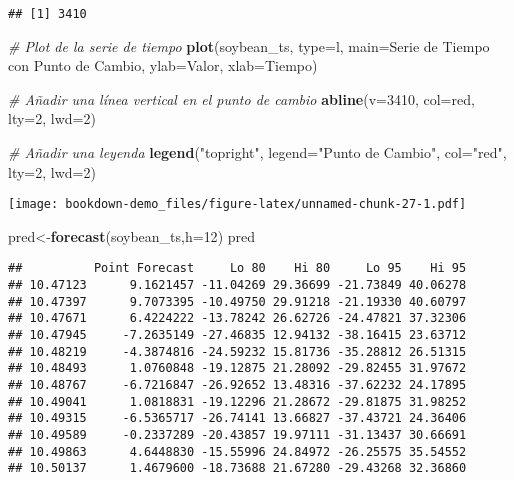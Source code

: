 \documentclass[
]{book}
\newenvironment{Shaded}{\begin{snugshade}}{\end{snugshade}}
\newcommand{\AttributeTok}[1]{\textcolor[rgb]{0.13,0.29,0.53}{#1}}
\newcommand{\CommentTok}[1]{\textcolor[rgb]{0.56,0.35,0.01}{\textit{#1}}}
\newcommand{\DecValTok}[1]{\textcolor[rgb]{0.00,0.00,0.81}{#1}}
\newcommand{\FunctionTok}[1]{\textcolor[rgb]{0.13,0.29,0.53}{\textbf{#1}}}
\newcommand{\NormalTok}[1]{#1}
\newcommand{\OtherTok}[1]{\textcolor[rgb]{0.56,0.35,0.01}{#1}}
\newcommand{\StringTok}[1]{\textcolor[rgb]{0.31,0.60,0.02}{#1}}
\begin{document}
\begin{verbatim}
## [1] 3410
\end{verbatim}

\begin{Shaded}
\begin{Highlighting}[]
\CommentTok{\# Plot de la serie de tiempo}
\FunctionTok{plot}\NormalTok{(soybean\_ts, }\AttributeTok{type=}\StringTok{\textquotesingle{}l\textquotesingle{}}\NormalTok{, }\AttributeTok{main=}\StringTok{\textquotesingle{}Serie de Tiempo con Punto de Cambio\textquotesingle{}}\NormalTok{, }\AttributeTok{ylab=}\StringTok{\textquotesingle{}Valor\textquotesingle{}}\NormalTok{, }\AttributeTok{xlab=}\StringTok{\textquotesingle{}Tiempo\textquotesingle{}}\NormalTok{)}

\CommentTok{\# Añadir una línea vertical en el punto de cambio}
\FunctionTok{abline}\NormalTok{(}\AttributeTok{v=}\DecValTok{3410}\NormalTok{, }\AttributeTok{col=}\StringTok{\textquotesingle{}red\textquotesingle{}}\NormalTok{, }\AttributeTok{lty=}\DecValTok{2}\NormalTok{, }\AttributeTok{lwd=}\DecValTok{2}\NormalTok{)}

\CommentTok{\# Añadir una leyenda}
\FunctionTok{legend}\NormalTok{(}\StringTok{"topright"}\NormalTok{, }\AttributeTok{legend=}\StringTok{"Punto de Cambio"}\NormalTok{, }\AttributeTok{col=}\StringTok{"red"}\NormalTok{, }\AttributeTok{lty=}\DecValTok{2}\NormalTok{, }\AttributeTok{lwd=}\DecValTok{2}\NormalTok{)}
\end{Highlighting}
\end{Shaded}

\texttt{[image: bookdown-demo\_files/figure-latex/unnamed-chunk-27-1.pdf]}

\begin{Shaded}
\begin{Highlighting}[]
\NormalTok{pred}\OtherTok{\textless{}{-}}\FunctionTok{forecast}\NormalTok{(soybean\_ts,}\AttributeTok{h=}\DecValTok{12}\NormalTok{)}
\NormalTok{pred}
\end{Highlighting}
\end{Shaded}

\begin{verbatim}
##          Point Forecast     Lo 80    Hi 80     Lo 95    Hi 95
## 10.47123      9.1621457 -11.04269 29.36699 -21.73849 40.06278
## 10.47397      9.7073395 -10.49750 29.91218 -21.19330 40.60797
## 10.47671      6.4224222 -13.78242 26.62726 -24.47821 37.32306
## 10.47945     -7.2635149 -27.46835 12.94132 -38.16415 23.63712
## 10.48219     -4.3874816 -24.59232 15.81736 -35.28812 26.51315
## 10.48493      1.0760848 -19.12875 21.28092 -29.82455 31.97672
## 10.48767     -6.7216847 -26.92652 13.48316 -37.62232 24.17895
## 10.49041      1.0818831 -19.12296 21.28672 -29.81875 31.98252
## 10.49315     -6.5365717 -26.74141 13.66827 -37.43721 24.36406
## 10.49589     -0.2337289 -20.43857 19.97111 -31.13437 30.66691
## 10.49863      4.6448830 -15.55996 24.84972 -26.25575 35.54552
## 10.50137      1.4679600 -18.73688 21.67280 -29.43268 32.36860
\end{verbatim}
\end{document}
